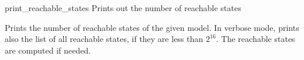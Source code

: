 \begin{nusmvCommand}{print\_reachable\_states} {Prints out the number of reachable states}


Prints the number of reachable states of the given model. In verbose
mode, prints also the list of all reachable states, if they are less than $2^{16}$.  The reachable
states are computed if needed.

\begin{cmdOpt}
\end{cmdOpt}

\end{nusmvCommand}
